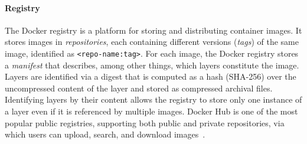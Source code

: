 

\paragraph{Registry}
%
The Docker registry is a platform for storing and distributing container images.
%
It stores images in \emph{repositories}, each containing different versions (\emph{tags}) of
the same image, identified as \texttt{<repo-name:tag>}.
%
For each image, the Docker registry stores a \emph{manifest} that describes,
among other things, which layers constitute the image.
%
%
Layers are identified via a digest that is computed as a hash (SHA-256)
over the uncompressed content of the layer and stored as compressed archival files.
%
%
%
%
%
Identifying layers by their content allows the registry to store only one instance
of a layer even if it is referenced by multiple images.
%
Docker Hub is one of the most popular public registries, supporting both
public and private repositories, via which users can upload, search, and
download images~\cite{docker-hub}.

%

%
%
%


